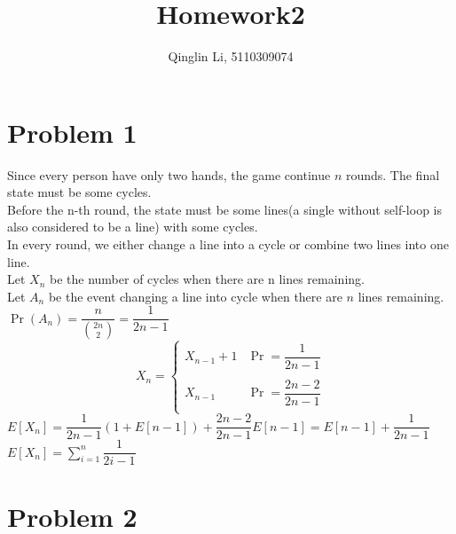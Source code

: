 \documentclass[12pt]{article}
\date{}
\title{Homework2}
\author{Qinglin Li, 5110309074}
\begin{document}
\maketitle
\section*{Problem 1}
Since every person have only two hands, the game continue $n$ rounds. The final state must be some cycles.\\
Before the n-th round, the state must be some lines(a single without self-loop is also considered to be a line) with some cycles.\\
In every round, we either change a line into a cycle or combine two lines into one line.\\
Let $X_n$ be the number of cycles when there are n lines remaining.\\
Let $A_n$ be the event changing a line into cycle when there are $n$ lines remaining.\\
$\Pr(A_n)=\dfrac{n}{\binom{2n}{2}}=\dfrac{1}{2n-1}$
    \begin{equation}
    X_n=\left\{
    \begin{array}{rl}
    X_{n-1}+1&\Pr=\dfrac{1}{2n-1}\\
    \\
    X_{n-1}&\Pr=\dfrac{2n-2}{2n-1}\\
    \end{array}
    \right.
    \end{equation} 
$E[X_n]=\dfrac{1}{2n-1}\left(1+E[n-1]\right)+\dfrac{2n-2}{2n-1}E[n-1]=E[n-1]+\dfrac{1}{2n-1}$\\
$E[X_n]=\displaystyle\sum_{i=1}^{n} \dfrac{1}{2i-1}$

\section*{Problem 2}
\end{document}
